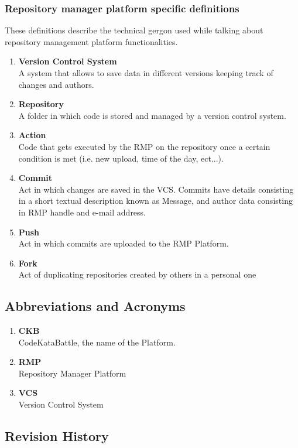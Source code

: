 \subsubsection[short]{Repository manager platform specific definitions}
These definitions describe the technical gergon used while talking about repository management platform functionalities.
\begin{enumerate}[label=$\bullet$]
    \item \textbf{Version Control System}\\A system that allows to save data in different versions keeping track of changes and authors.
    \item \textbf{Repository}\\A folder in which code is stored and managed by a version control system.
    \item \textbf{Action}\\Code that gets executed by the RMP on the repository once a certain condition is met (i.e. new upload, time of the day, ect...).
    \item \textbf{Commit}\\Act in which changes are saved in the VCS. Commits have details consisting in a short textual description known as Message, and author data consisting in RMP handle and e-mail address.
    \item \textbf{Push}\\Act in which commits are uploaded to the RMP Platform.
    \item \textbf{Fork}\\Act of duplicating repositories created by others in a personal one
\end{enumerate}
\subsection{Abbreviations and Acronyms}
\begin{enumerate}[label=$\bullet$]
    \item \textbf{CKB}\\CodeKataBattle, the name of the Platform.
    \item \textbf{RMP}\\Repository Manager Platform
    \item \textbf{VCS}\\Version Control System
\end{enumerate}

\subsection{Revision History}

